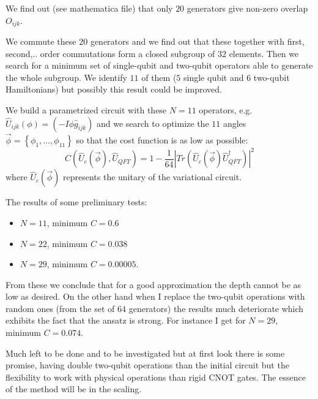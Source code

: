 \documentclass[pra,onecolumn,superscriptaddress]{revtex4}%
\begin{document}
We find out (see mathematica file) that only $20$ generators give non-zero overlap $O_{ijk}$.

We commute these $20$ generators and we find out that these together with first, second,.. order commutations form
a closed subgroup of $32$ elements. Then we search for a minimum set of single-qubit and two-qubit operators able to generate the whole
subgroup. We identify $11$ of them ($5$ single qubit and $6$ two-qubit Hamiltonians) but possibly this result could be improved.

We build a parametrized circuit with these $N=11$ operators, e.g. $\hat{U}_{ijk}\left(\phi\right)=\left(-I \phi \hat{g}_{ijk}\right)$ and we search to optimize the $11$ angles $\vec{\phi}=\left\{\phi_1,\ldots, \phi_{11}\right\}$ so that the cost function is as low as possible:
\begin{equation}
C\left(\hat{U}_c\left(\vec{\phi}\right), \hat{U}_{QFT}\right)=1-\frac{1}{64}\left|Tr\left(\hat{U}_c\left(\vec{\phi}\right)\hat{U}_{QFT}^{\dagger} \right)\right|^2
\end{equation}
where $\hat{U}_c\left(\vec{\phi}\right)$ represents the unitary of the variational circuit.

The results of some preliminary tests:
\begin{itemize}
	\item $N=11$, minimum $C=0.6$
	\item $N=22$, minimum $C=0.038$
	\item $N=29$, minimum $C=0.00005$.
\end{itemize}
From these we conclude that for a good approximation the depth cannot be as low as desired.
On the other hand when I replace the two-qubit operations with random ones (from the set of $64$ generators) the 
results much deteriorate which exhibits the fact that the ansatz is strong. For instance I get for $N=29$, minimum $C=0.074$.

Much left to be done and to be investigated but at first look there is some promise, having double two-qubit operations
than the initial circuit but the flexibility to work with physical operations than rigid CNOT gates.
The essence of the method will be in the scaling.


\begin{thebibliography}{99}                                                                                               %




\end{thebibliography}
\end{document}
